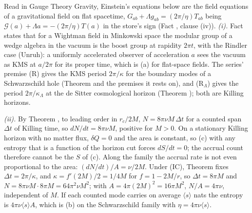 Read in Gauge Theory Gravity, Einstein's equations below are the field equations of a gravitational field on flat spacetime, $G_{ab} + \Lambda g_{ab} = (2\pi/\eta)T_{ab}$ being $\mathcal{G}(a) + \Lambda a = -(2\pi/\eta)T(a)$ in the store's sign (Fact , clause (iv)). \emph{(i).} Fact  states that for a Wightman field in Minkowski space the modular group of a wedge algebra in the vacuum is the boost group at rapidity $2\pi t$, with the Rindler case (Unruh): a uniformly accelerated observer of acceleration $a$ sees the vacuum as KMS at $a/2\pi$ for its proper time, which is (a) for flat-space fields. The series' premise (R) gives the KMS period $2\pi/\kappa$ for the boundary modes of a Schwarzschild hole (Theorem  and the premises it rests on), and (R$_{\Lambda}$) gives the period $2\pi/\kappa_{\Lambda}$ at the de Sitter cosmological horizon (Theorem ); both are Killing horizons.

\emph{(ii).} By Theorem , to leading order in $r_{c}/2M$, $N = 8\pi\nu M\,\Delta t$ for a counted span $\Delta t$ of Killing time, so $dN/dt = 8\pi\nu M$, positive for $M > 0$. On a stationary Killing horizon with no matter flux, $\delta Q = 0$ and the area is constant, so (c) with any entropy that is a function of the horizon cut forces $dS/dt = 0$; the accrual count therefore cannot be the $S$ of (c). Along the family the accrual rate is not even proportional to the area: $(dN/dt)/A = \nu/2M$. Under (IC), Theorem  fixes $\Delta t = 2\pi/\kappa$, and $\kappa = f'(2M)/2 = 1/4M$ for $f = 1 - 2M/r$, so $\Delta t = 8\pi M$ and $N = 8\pi\nu M\cdot 8\pi M = 64\pi^{2}\nu M^{2}$; with $A = 4\pi(2M)^{2} = 16\pi M^{2}$, $N/A = 4\pi\nu$, independent of $M$. If each counted mode carries on average $\langle s\rangle$ nats the entropy is $4\pi\nu\langle s\rangle A$, which is (b) on the Schwarzschild family with $\eta = 4\pi\nu\langle s\rangle$.

